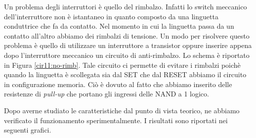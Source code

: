 
Un problema degli interruttori è quello del rimbalzo.
Infatti lo switch meccanico dell'interruttore non è istantaneo in quanto composto da una linguetta conduttrice che fa da contatto.
Nel momento in cui la linguetta passa da un contatto all'altro abbiamo dei rimbalzi di tensione.
Un modo per risolvere questo problema è quello di utilizzare un interruttore a transistor oppure inserire appena dopo l'interruttore meccanico un circuito di anti-rimbalzo.
Lo schema è riportato in Figura \ref{cir11:no-rimb}.
Tale circuito ci permette di evitare i rimbalzi poichè quando la linguetta è scollegata sia dal SET che dal RESET abbiamo il circuito in configurazione memoria.
Ciò è dovuto al fatto che abbiamo inserito delle resistenze di \textit{pull-up} che portano gli ingressi delle NAND a 1 logico.

Dopo averne studiato le caratteristiche dal punto di vista teorico, ne abbiamo verificato il funzionamento sperimentalmente.
I risultati sono riportati nei seguenti grafici.


